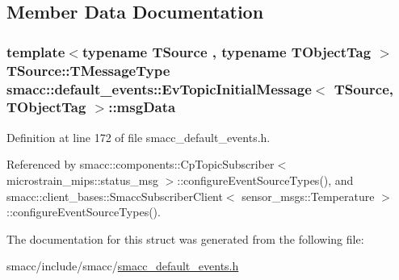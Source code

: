 \subsection{Member Data Documentation}
\subsubsection[{\texorpdfstring{msg\+Data}{msgData}}]{\setlength{\rightskip}{0pt plus 5cm}template$<$typename T\+Source , typename T\+Object\+Tag $>$ T\+Source\+::\+T\+Message\+Type {\bf smacc\+::default\+\_\+events\+::\+Ev\+Topic\+Initial\+Message}$<$ T\+Source, T\+Object\+Tag $>$\+::msg\+Data}\hypertarget{structsmacc_1_1default__events_1_1EvTopicInitialMessage_a989c7cf4210c7750806b081bc73112cd}{}\label{structsmacc_1_1default__events_1_1EvTopicInitialMessage_a989c7cf4210c7750806b081bc73112cd}


Definition at line 172 of file smacc\+\_\+default\+\_\+events.\+h.



Referenced by smacc\+::components\+::\+Cp\+Topic\+Subscriber$<$ microstrain\+\_\+mips\+::status\+\_\+msg $>$\+::configure\+Event\+Source\+Types(), and smacc\+::client\+\_\+bases\+::\+Smacc\+Subscriber\+Client$<$ sensor\+\_\+msgs\+::\+Temperature $>$\+::configure\+Event\+Source\+Types().



The documentation for this struct was generated from the following file\+:\begin{DoxyCompactItemize}
\item 
smacc/include/smacc/\hyperlink{smacc__default__events_8h}{smacc\+\_\+default\+\_\+events.\+h}\end{DoxyCompactItemize}

